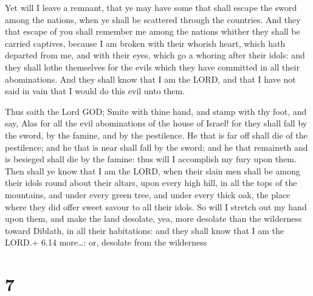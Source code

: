  Yet will I leave a remnant, that ye may have some that
shall escape the sword among the nations, when ye shall be scattered
through the countries.  And they that escape of you shall
remember me among the nations whither they shall be carried captives,
because I am broken with their whorish heart, which hath departed from
me, and with their eyes, which go a whoring after their idols: and they
shall lothe themselves for the evils which they have committed in all
their abominations.  And they shall know that I am the
LORD, and that I have not said in vain that I would do this evil unto
them.

 Thus saith the Lord GOD; Smite with thine hand, and
stamp with thy foot, and say, Alas for all the evil abominations of the
house of Israel! for they shall fall by the sword, by the famine, and by
the pestilence.  He that is far off shall die of the
pestilence; and he that is near shall fall by the sword; and he that
remaineth and is besieged shall die by the famine: thus will I
accomplish my fury upon them.  Then shall ye know that I am
the LORD, when their slain men shall be among their idols round about
their altars, upon every high hill, in all the tops of the mountains,
and under every green tree, and under every thick oak, the place where
they did offer sweet savour to all their idols.  So will I
stretch out my hand upon them, and make the land desolate, yea, more
desolate than the wilderness toward Diblath, in all their habitations:
and they shall know that I am the LORD.+ 6.14 more\ldots: or, desolate
from the wilderness

\hypertarget{section-6}{%
\section{7}\label{section-6}}

